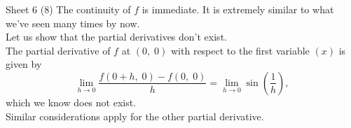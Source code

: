 \documentclass[handout, aspectratio=169]{beamer}
\begin{document}
\begin{frame}{Sheet 6}
	(8) The continuity of $f$ is immediate. It is extremely similar to what we've seen many times by now.\\
	Let us show that the partial derivatives don't exist.\\
	The partial derivative of $f$ at $(0,\;0)$ with respect to the first variable $(x)$ is given by
	\[\lim_{h\to 0}\frac{f(0 + h,\; 0) - f(0,\;0)}{h} = \lim_{h\to 0}\sin\left(\frac{1}{h}\right),\]
	which we know does not exist.\\
	Similar considerations apply for the other partial derivative.
\end{frame}
\end{document}
